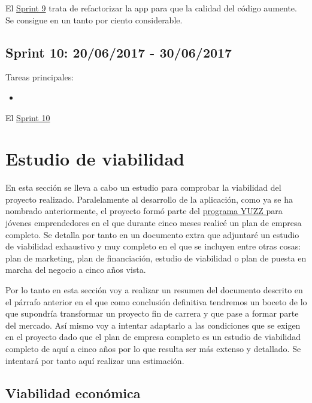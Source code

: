 
El \underline{Sprint 9} trata de refactorizar la app para que la calidad del código aumente. Se consigue en un tanto por ciento considerable. 

\subsection{Sprint 10: 20/06/2017 - 30/06/2017}\label{sprint10}

Tareas principales:

\begin{itemize}
	\item 
\end{itemize}


El \underline{Sprint 10} 


\section{Estudio de viabilidad}\label{estudio-viabilidad}
En esta sección se lleva a cabo un estudio para comprobar la viabilidad del proyecto realizado. Paralelamente al desarrollo de la aplicación, como ya se ha nombrado anteriormente, el proyecto formó parte del \underline{programa YUZZ } para jóvenes emprendedores en el que durante cinco meses realicé un plan de empresa completo. Se detalla por tanto en un documento extra que adjuntaré un estudio de viabilidad exhaustivo  y muy completo en el que se incluyen entre otras cosas: plan de marketing, plan de financiación, estudio de viabilidad o plan de puesta en marcha del negocio a cinco años vista. 

Por lo tanto en esta sección voy a realizar un resumen del documento descrito en el párrafo anterior en el que como conclusión definitiva tendremos un boceto de lo que supondría transformar un proyecto fin de carrera y que pase a formar parte del mercado. Así mismo voy a intentar adaptarlo a las condiciones que se exigen en el proyecto dado que el plan de empresa completo es un estudio de viabilidad completo de aquí a cinco años por lo que resulta ser más extenso y detallado. Se intentará por tanto aquí realizar una estimación.

\subsection{Viabilidad económica}\label{viabilidad-economica}

